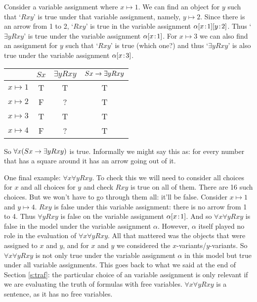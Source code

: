 Consider a variable assignment where $x\mapsto 1$. We can find an object for $y$ such that `$Rxy$' is true under that variable assignment, namely, $y\mapsto 2$. Since there is an arrow from 1 to 2, `$Rxy$' is true in the variable assignment $\alpha[x \!:\! 1][y \!:\! 2]$. Thus `$\exists y Rxy$' is true under the variable assignment $\alpha[x \!:\! 1]$. For $x\mapsto 3$ we can also find an assignment for $y$ such that `$Rxy$' is true (which one?) and thus  `$\exists y Rxy$' is also true under the variable assignment $\alpha[x \!:\! 3]$.
\begin{center}
\begin{tabular}{c|ccc}
&$Sx$&$\exists y Rxy$&$Sx\rightarrow\exists y Rxy$\Bstrut\\\hline\Tstrut
$x\mapsto 1$&T&T&T\\
$x\mapsto 2$&F&?&T\\
$x\mapsto 3$&T&T&T\\
$x\mapsto 4$&F&?&T
\end{tabular}
\end{center}So $\forall x(Sx\rightarrow \exists y Rxy)$ is true. Informally we might say this as: for every number that has a square around it has an arrow going out of it.

One final example: $\forall x\forall y Rxy$. To check this we will need to consider all choices for $x$ and all choices for $y$ and check $Rxy$ is true on all of them. There are 16 such choices. But we won't have to go through them all: it'll be false. Consider $x\mapsto 1$ and $y\mapsto 4$. $Rxy$ is false under this variable assignment: there is no arrow from 1 to 4. Thus $\forall yRxy$ is false on the variable assignment $\alpha[x \!:\! 1]$. And so $\forall x\forall y Rxy$ is false in the model under the variable assignment $\alpha$. However, $\alpha$ itself played no role in the evaluation of $\forall x\forall y Rxy$. All that mattered was the objects that were assigned to $x$ and $y$, and for $x$ and $y$ we considered the $x$-variants/$y$-variants. So $\forall x\forall y Rxy$ is not only true under the variable assignment $\alpha$ in this model but true under all variable assignments. This goes back to what we said at the end of Section \ref{s:traf}: the particular choice of an variable assignment is only relevant if we are evaluating the truth of formulas with free variables. $\forall x\forall y Rxy$ is a sentence, as it has no free variables.

